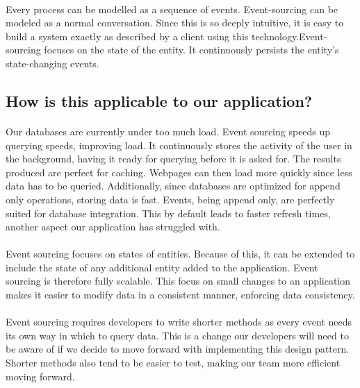 \documentclass{turabian-researchpaper}
\begin{document}
\paragraph{}
Every process can be modelled as a sequence of events. Event-sourcing can be modeled as a normal conversation. Since this is so deeply intuitive, it is easy to build a system exactly as described by a client using this technology.\cite{sullivan}Event-sourcing focuses on the state of the entity. It continuously persists the entity’s state-changing events.\cite{microservices.io}
\par
\subsection{How is this applicable to our application?}
\paragraph{}
Our databases are currently under too much load. Event sourcing speeds up querying speeds, improving load. It continuously stores the activity of the user in the background, having it ready for querying before it is asked for. The results produced are perfect for caching. Webpages can then load more quickly since less data has to be queried. Additionally, since databases are optimized for append only operations, storing data is fast. Events, being append only, are perfectly suited for database integration.\cite{sullivan}
This by default leads to faster refresh times, another aspect our application has struggled with.
\par
\paragraph{}
Event sourcing focuses on states of entities. Because of this, it can be extended to include the state of any additional entity added to the application. Event sourcing is therefore fully scalable. This focus on small changes to an application makes it easier to modify data in a consistent manner, enforcing data consistency.\cite{microservices.io}
\par
\paragraph{}
Event sourcing requires developers to write shorter methods as every event needs its own way in which to query data. This is a change our developers will need to be aware of if we decide to move forward with implementing this design pattern. Shorter methods also tend to be easier to test, making our team more efficient moving forward.\cite{hauer_2019}
\par
\endsubsection
\endsection
\end{document}

